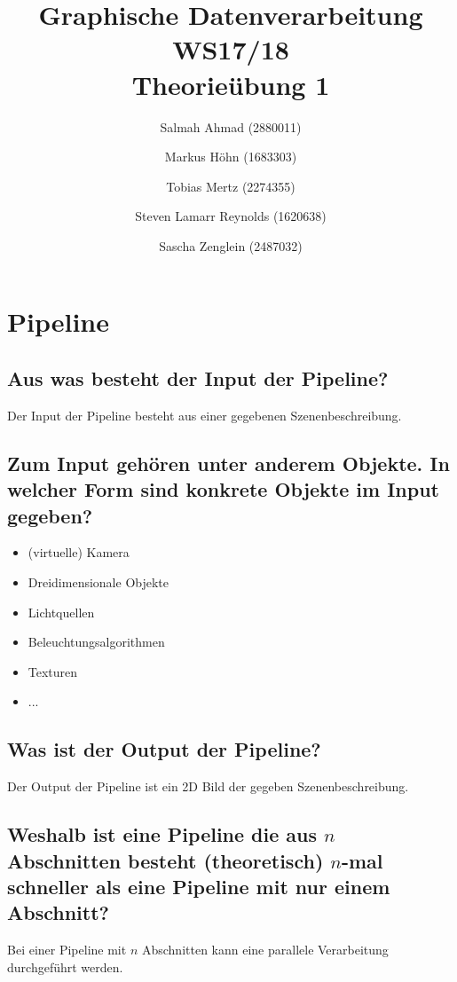 \documentclass[a4paper,10pt,DIV=14]{scrartcl}
\newcommand{\gqq}[1]{\glqq{}#1\grqq{}}
\begin{document}
\title{Graphische Datenverarbeitung WS17/18 \\ Theorieübung 1}
\author{
  Salmah Ahmad (2880011)
  \and
  Markus Höhn (1683303)
  \and
  Tobias Mertz (2274355)
  \and
  Steven Lamarr Reynolds (1620638)
  \and
  Sascha Zenglein (2487032)
}

\maketitle

\section{Pipeline}

\subsection{Aus was besteht der Input der Pipeline?}
Der Input der Pipeline besteht aus einer gegebenen Szenenbeschreibung.


\subsection{Zum Input gehören unter anderem \gqq{Objekte}. In welcher Form sind konkrete \gqq{Objekte} im Input gegeben?}

\begin{itemize}[itemsep=0pt]
	\item (virtuelle) Kamera
	\item Dreidimensionale Objekte
	\item Lichtquellen
	\item Beleuchtungsalgorithmen
	\item Texturen
	\item ...
\end{itemize}


\subsection{Was ist der Output der Pipeline?}
Der Output der Pipeline ist ein 2D Bild der gegeben Szenenbeschreibung.


\subsection{Weshalb ist eine Pipeline die aus $n$ Abschnitten besteht (theoretisch) $n$-mal schneller als eine Pipeline mit nur einem Abschnitt?}
Bei einer Pipeline mit $n$ Abschnitten kann eine parallele Verarbeitung durchgeführt werden.
\end{document}
